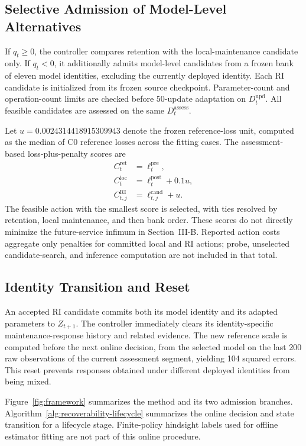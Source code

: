\documentclass[journal]{IEEEtran}
\begin{document}
\subsection{Selective Admission of Model-Level Alternatives}
If $q_t\geq0$, the controller compares retention with the
local-maintenance candidate only. If $q_t<0$, it additionally
admits model-level candidates from a frozen bank of eleven
model identities, excluding the currently deployed identity.
Each RI candidate is initialized from its frozen source checkpoint.
Parameter-count and operation-count limits are checked before
50-update adaptation on $D_t^{\mathrm{upd}}$. All feasible
candidates are assessed on the same $D_t^{\mathrm{assess}}$.

Let $u=0.0024314418915309943$ denote the frozen reference-loss
unit, computed as the median of C0 reference losses across the
fitting cases. The assessment-based loss-plus-penalty scores are
\begin{align}
C_t^{\mathrm{ret}}&=\ell_t^{\mathrm{pre}},\\
C_t^{\mathrm{loc}}&=\ell_t^{\mathrm{post}}+0.1u,\\
C_{t,j}^{\mathrm{RI}}&=\ell_{t,j}^{\mathrm{cand}}+u.
\end{align}
The feasible action with the smallest score is selected,
with ties resolved by retention, local maintenance, and then
bank order. These scores do not directly minimize the
future-service infimum in Section~III-B. Reported action
costs aggregate only penalties for committed local and RI
actions; probe, unselected candidate-search, and inference
computation are not included in that total.

\subsection{Identity Transition and Reset}
An accepted RI candidate commits both its model identity and
its adapted parameters to $Z_{t+1}$. The controller immediately
clears its identity-specific maintenance-response history and
related evidence. The new reference scale is computed before
the next online decision, from the selected model on the last
200 raw observations of the current assessment segment,
yielding 104 squared errors. This reset prevents responses
obtained under different deployed identities from being mixed.


Figure~\ref{fig:framework} summarizes the method and its two admission branches.
Algorithm~\ref{alg:recoverability-lifecycle} summarizes the
online decision and state transition for a lifecycle stage.
Finite-policy hindsight labels used for offline estimator fitting
are not part of this online procedure.
\end{document}
